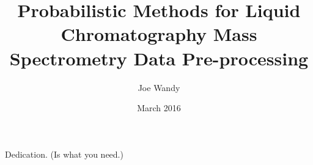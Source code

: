 \documentclass[oneside]{glasgowthesis}
\begin{document}
\pagestyle{empty}

\title{Probabilistic Methods for Liquid Chromatography Mass Spectrometry Data Pre-processing}
\author{Joe Wandy}
\date{March 2016}

\maketitle

\newpage

 

\newpage
 

\newpage
\vspace*{1.75in}
\begin{flushright} Dedication. (Is what you need.)\end{flushright}








\tableofcontents
\listoftables
\listoffigures

\newpage
\pagestyle{fancy}
\setcounter{page}{1}
\end{document}
